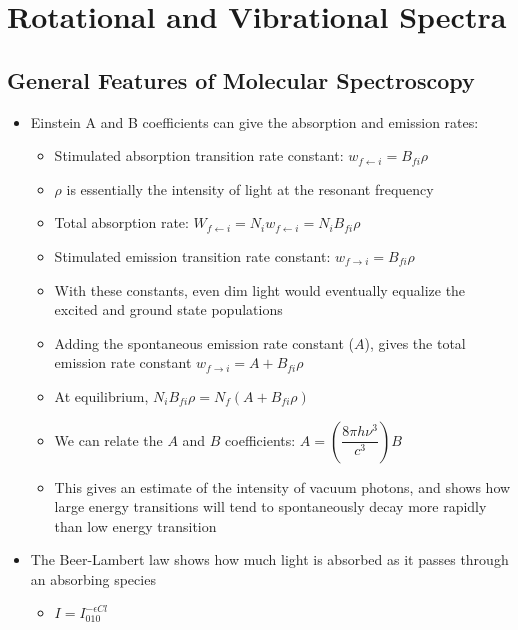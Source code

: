 \documentclass[12pt, openany, letterpaper]{memoir}
\begin{document}
\chapter{Rotational and Vibrational Spectra}
\section{General Features of Molecular Spectroscopy}
\begin{itemize}
	\item Einstein A and B coefficients can give the absorption and emission rates:
	\begin{itemize}
		\item Stimulated absorption transition rate constant: $w_{f\leftarrow i}=B_{fi}\rho$
		\item $\rho$ is essentially the intensity of light at the resonant frequency
		\item Total absorption rate: $W_{f\leftarrow i} = N_iw_{f\leftarrow i}=N_iB_{fi}\rho$
		\item Stimulated emission transition rate constant: $w_{f\rightarrow i}=B_{fi}\rho$
		\item With these constants, even dim light would eventually equalize the excited and ground state populations
		\item Adding the spontaneous emission rate constant ($A$), gives the total emission rate constant $w_{f\rightarrow i}=A+B_{fi}\rho$
		\item At equilibrium, $N_iB_{fi}\rho=N_f\left(A+B_{fi}\rho\right)$
		\item We can relate the $A$ and $B$ coefficients: $A=\left(\dfrac{8\pi h\nu^3}{c^3}\right)B$
		\item This gives an estimate of the intensity of vacuum photons, and shows how large energy transitions will tend to spontaneously decay more rapidly than low energy transition
	\end{itemize}	
	\item The Beer-Lambert law shows how much light is absorbed as it passes through an absorbing species
	\begin{itemize}
		\item $I=I_010^{-\epsilon C l}$ 
		

\end{itemize}
\end{itemize}
\end{document}
